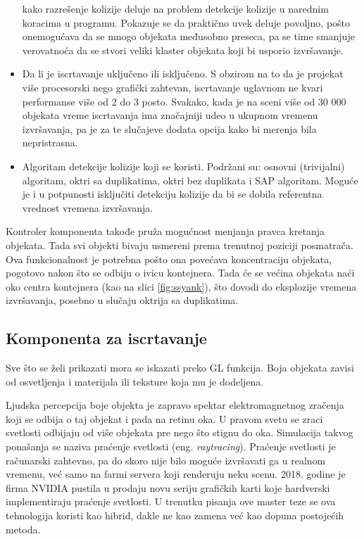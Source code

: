 \documentclass[12pt,oneside]{memoir}
\begin{document}
\begin{itemize}
	kako razrešenje kolizije deluje na problem detekcije kolizije u narednim koracima u programu. Pokazuje se da praktično uvek deluje povoljno, pošto onemogućava da se mnogo 
	objekata međusobno preseca, pa se time smanjuje verovatnoća da se stvori veliki klaster objekata koji bi usporio izvršavanje.
	\item Da li je iscrtavanje uključeno ili isključeno. 
	S obzirom na to da je projekat više procesorski nego grafički zahtevan, iscrtavanje uglavnom ne kvari performanse više od 2 do 3 posto.
	Svakako, kada je na sceni više od 30 000 objekata vreme iscrtavanja ima značajniji udeo u ukupnom vremenu izvršavanja,
	pa je za te slučajeve dodata opcija kako bi merenja bila nepristrasna.
	\item Algoritam detekcije kolizije koji se koristi. Podržani su: osnovni (trivijalni) algoritam, oktri sa duplikatima,
	oktri bez duplikata i SAP algoritam. Moguće je i u potpunosti isključiti detekciju kolizije da bi se dobila referentna vrednost vremena izvršavanja.

\end{itemize}  

Kontroler komponenta takođe pruža mogućnost menjanja pravca kretanja objekata. 
Tada svi objekti bivaju usmereni prema trenutnoj poziciji posmatrača. 
Ova funkcionalnost je potrebna pošto ona povećava koncentraciju objekata, 
pogotovo nakon što se odbiju o ivicu kontejnera. Tada će se većina objekata 
naći oko centra kontejnera (kao na slici \ref{fig:ssyank}), što dovodi do eksplozije vremena izvršavanja, posebno u slučaju oktrija sa duplikatima.

\subsection{Komponenta za iscrtavanje}

Sve što se želi prikazati mora se iskazati preko GL funkcija. 
Boja objekata zavisi od osvetljenja i materijala ili teksture koja mu je dodeljena.

Ljudska percepcija boje objekta je zapravo spektar elektromagnetnog zračenja koji se odbija o taj objekat i pada na retinu oka.
U pravom svetu se zraci svetlosti odbijaju od više objekata pre nego što stignu do oka. 
Simulacija takvog ponašanja se naziva praćenje svetlosti (eng. {\em raytracing}).  
Praćenje svetlosti je računarski zahtevno, pa do skoro nije bilo moguće izvršavati ga u realnom vremenu, već samo na farmi servera koji renderuju neku scenu.
2018. godine je firma NVIDIA pustila u prodaju novu seriju grafičkih karti koje hardverski implementiraju praćenje svetlosti. 
U trenutku pisanja ove master teze se ova tehnologija koristi kao hibrid, dakle ne kao zamena već kao dopuna postojećih metoda.
\end{document}
